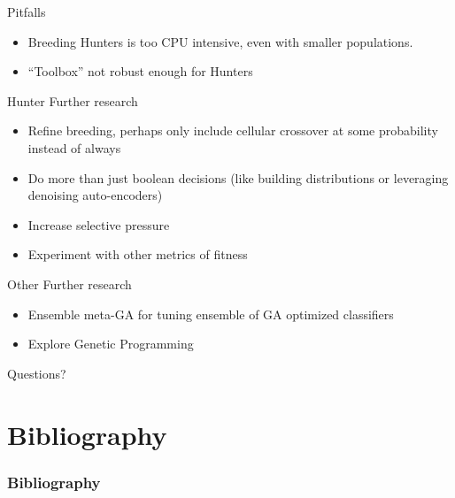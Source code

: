 \documentclass{beamer}
\begin{document}
\begin{frame}{Pitfalls}
\begin{itemize}
	\item Breeding Hunters is too CPU intensive, even with smaller populations.
	\item ``Toolbox'' not robust enough for Hunters
\end{itemize}
\end{frame}
\begin{frame}{Hunter Further research}
	\begin{itemize}
		\item Refine breeding, perhaps only include cellular crossover at some probability instead of always
		\item Do more than just boolean decisions (like building distributions or leveraging denoising auto-encoders)
		\item Increase selective pressure
		\item Experiment with other metrics of fitness
	\end{itemize}
\end{frame}

\begin{frame}{Other Further research}
	\begin{itemize}
		\item Ensemble meta-GA for tuning ensemble of GA optimized classifiers
		\item Explore Genetic Programming
	\end{itemize}
\end{frame}

\begin{frame}{Questions?}
\end{frame}

\section{Bibliography}
\begin{frame}[allowframebreaks]
	\frametitle{Bibliography}
	
\end{frame}
\end{document}
